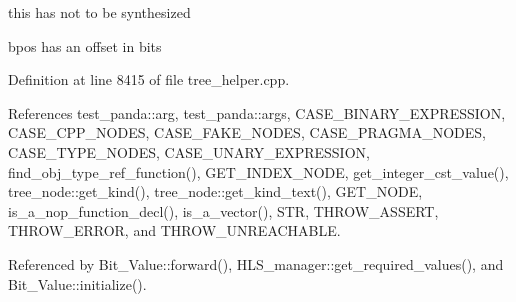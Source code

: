 this has not to be synthesized

bpos has an offset in bits 

Definition at line 8415 of file tree\+\_\+helper.\+cpp.



References test\+\_\+panda\+::arg, test\+\_\+panda\+::args, C\+A\+S\+E\+\_\+\+B\+I\+N\+A\+R\+Y\+\_\+\+E\+X\+P\+R\+E\+S\+S\+I\+ON, C\+A\+S\+E\+\_\+\+C\+P\+P\+\_\+\+N\+O\+D\+ES, C\+A\+S\+E\+\_\+\+F\+A\+K\+E\+\_\+\+N\+O\+D\+ES, C\+A\+S\+E\+\_\+\+P\+R\+A\+G\+M\+A\+\_\+\+N\+O\+D\+ES, C\+A\+S\+E\+\_\+\+T\+Y\+P\+E\+\_\+\+N\+O\+D\+ES, C\+A\+S\+E\+\_\+\+U\+N\+A\+R\+Y\+\_\+\+E\+X\+P\+R\+E\+S\+S\+I\+ON, find\+\_\+obj\+\_\+type\+\_\+ref\+\_\+function(), G\+E\+T\+\_\+\+I\+N\+D\+E\+X\+\_\+\+N\+O\+DE, get\+\_\+integer\+\_\+cst\+\_\+value(), tree\+\_\+node\+::get\+\_\+kind(), tree\+\_\+node\+::get\+\_\+kind\+\_\+text(), G\+E\+T\+\_\+\+N\+O\+DE, is\+\_\+a\+\_\+nop\+\_\+function\+\_\+decl(), is\+\_\+a\+\_\+vector(), S\+TR, T\+H\+R\+O\+W\+\_\+\+A\+S\+S\+E\+RT, T\+H\+R\+O\+W\+\_\+\+E\+R\+R\+OR, and T\+H\+R\+O\+W\+\_\+\+U\+N\+R\+E\+A\+C\+H\+A\+B\+LE.



Referenced by Bit\+\_\+\+Value\+::forward(), H\+L\+S\+\_\+manager\+::get\+\_\+required\+\_\+values(), and Bit\+\_\+\+Value\+::initialize().

